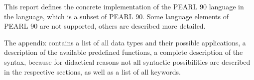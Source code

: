
This report defines the concrete implementation of the PEARL 90
language in the \OpenPEARL{} language, which is a subset of PEARL 90.
Some language elements of 
PEARL 90  are not supported, others are described more detailed.

The appendix contains a list of all data types and their possible
applications, a description of the available predefined functions, a
complete description of the syntax, because for didactical reasons not
all syntactic possibilities are described in the respective sections, as
well as a list of all keywords.

